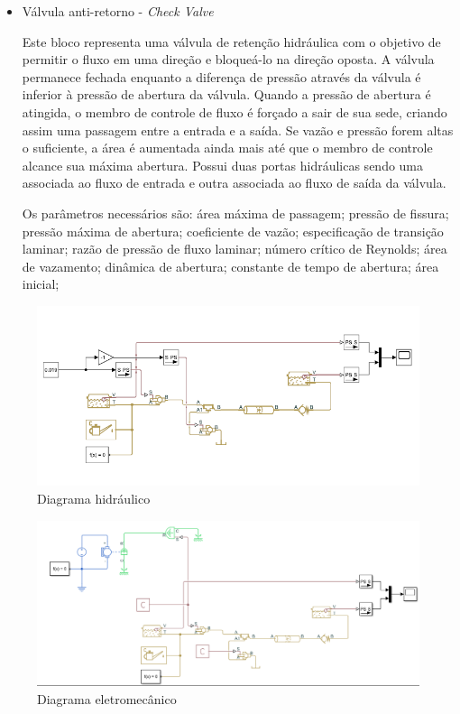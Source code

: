 \begin{itemize}
	\item Válvula anti-retorno - \textit{Check Valve}
	\par Este bloco representa uma válvula de retenção hidráulica com o objetivo de permitir o fluxo em uma direção e bloqueá-lo na direção oposta. A válvula permanece fechada enquanto a diferença de pressão através da válvula é inferior à pressão de abertura da válvula. Quando a pressão de abertura é atingida, o membro de controle de fluxo é forçado a sair de sua sede, criando assim uma passagem entre a entrada e a saída. Se vazão e pressão forem altas o suficiente, a área é aumentada ainda mais até que o membro de controle alcance sua máxima abertura. Possui duas portas hidráulicas sendo uma associada ao fluxo de entrada e outra associada ao fluxo de saída da válvula. 
	\par Os parâmetros necessários são: área máxima de passagem; pressão de fissura; pressão máxima de abertura; coeficiente de vazão; especificação de transição laminar; razão de pressão de fluxo laminar; número crítico de Reynolds; área de vazamento; dinâmica de abertura; constante de tempo de abertura; área inicial;

\end{itemize}

\begin{figure}[H]
\centering
\includegraphics[width=1\textwidth]{figuras/diagrama_hidraulico.png}
\caption{Diagrama hidráulico}
\label{fig:metodologia}
\end{figure}

\begin{figure}[H]
\centering
\includegraphics[width=1\textwidth]{figuras/diagrama_mecanico.png}
\caption{Diagrama eletromecânico}
\label{fig:metodologia}
\end{figure}

